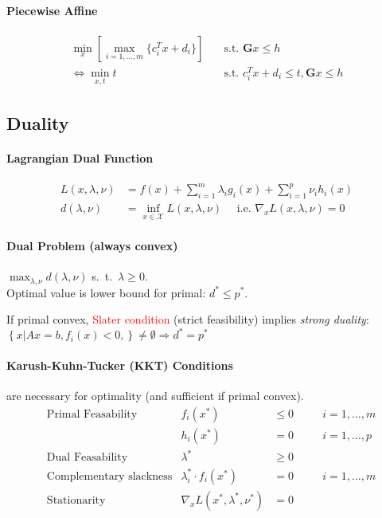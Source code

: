 \documentclass[landscape,a4paper,8pt]{scrartcl}
\newcommand{\remph}[1]{{\textcolor{red}{#1}}}
\newcommand{\mc}[1]{\mathcal{#1}}
\newcommand\vG{\bm{G}}
\begin{document}
\begin{multicols*}{3}
\paragraph{Piecewise Affine}
\begin{align*}
\min_x \left[ \max_{i=1,\dots,m} \{ c_i^Tx + d_i \} \right] & \quad \text{s.t.\ } \vG x \leq h \\
\iff \min_{x,t} t & \quad \text{s.t.\ } c_i^T x + d_i \leq t, \vG x \leq h
\end{align*}

\subsection{Duality}
\paragraph{Lagrangian Dual Function}
\begin{align*}
	L(x,\lambda,\nu) & = f(x) + \sum_{i=1}^{m}\lambda_i g_i(x) + \sum_{i=1}^{p}\nu_i h_i(x) \\
	d(\lambda,\nu) & = \inf_{x \in \mc{X}} L(x,\lambda,\nu) \quad \text{ i.e. } \nabla_x L(x, \lambda, \nu) = 0
\end{align*}
\paragraph{Dual Problem (always convex)} 
$\max_{\lambda,\nu} d(\lambda,\nu)$ s.\ t.\ $\lambda \geq 0$. \\
Optimal value is lower bound for primal: $d^* \leq p^*$.

If primal convex, \remph{Slater condition} (strict feasibility) implies \emph{strong duality}:
$\left\{x \left| \right. Ax=b, f_i(x)<0, \right\} \neq \emptyset \Rightarrow d^*  = p^* $
%
\paragraph{Karush-Kuhn-Tucker (KKT) Conditions}
are necessary for optimality (and sufficient if primal convex).
\begin{align*}
& \text{Primal Feasability} & f_i(x^*)  &\leq 0 \quad && i=1,\dots,m \\
&                           & h_i(x^*)  &=0 \quad && i=1,\dots,p \\
& \text{Dual Feasability}        & \lambda^* & \geq 0 && \\
& \text{Complementary slackness} & \lambda_i^* \cdot f_i(x^*) & = 0 && i = 1,\dots,m \\
& \text{Stationarity} & \nabla_x L(x^*,\lambda^*,\nu^*) & = 0 && \\
\end{align*}
%

\end{multicols*}
\end{document}

